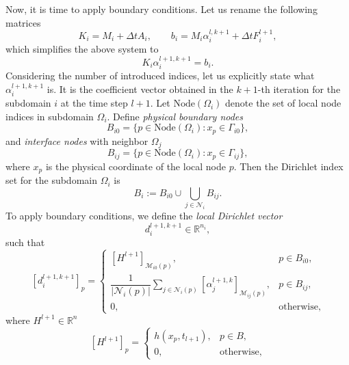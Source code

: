 \documentclass[a4paper, 11pt]{article}
\theoremstyle{plain}
\theoremstyle{definition}
\theoremstyle{remark}
\begin{document}
Now, it is time to apply boundary conditions. Let us rename the following matrices
\begin{equation*}
    K_{i} = M_{i} + \Delta t A_{i}, \qquad b_{i} = M_{i} \alpha_{i}^{l, k+1} + \Delta tF_{i}^{l+1}, 
\end{equation*}
which simplifies the above system to
\begin{equation*}
    K_{i}\alpha_{i}^{l+1, k+1} = b_{i}.
\end{equation*}
Considering the number of introduced indices, let us explicitly state what $\alpha_{i}^{l+1, k+1}$ is. It is the coefficient vector obtained in the $k+1$-th iteration for the subdomain $i$ at the time step $l+1$. Let $\text{Node}(\Omega_{i})$ denote the set of local node indices in subdomain $\Omega_{i}$. Define \textit{physical boundary nodes}
\begin{equation*}
    B_{i0} = \{p\in \text{Node}(\Omega_{i}): x_{p}\in \Gamma_{i0}\},
\end{equation*}
and \textit{interface nodes} with neighbor $\Omega_{j}$
\begin{equation*}
    B_{ij} = \{p\in \text{Node}(\Omega_{i}): x_{p}\in \Gamma_{ij}\},
\end{equation*}
where $x_p$ is the physical coordinate of the local node $p$. Then the Dirichlet index set for the subdomain $\Omega_{i}$ is
\begin{equation*}
    B_{i} := B_{i0} \cup \bigcup_{j\in\mathcal N_i} B_{ij}.
\end{equation*}
To apply boundary conditions, we define the \textit{local Dirichlet vector} 
\begin{equation*}
    d^{l+1, k+1}_{i} \in \mathbb{R}^{n_{i}},
\end{equation*}
such that
\begin{equation*}
    \left[d^{l+1, k+1}_{i}\right]_{p} = 
    \begin{cases}
        \left[H^{l+1}\right]_{\mathcal{M}_{i0}(p)}, & p\in B_{i0},\\[3pt]
        \dfrac{1}{\lvert \mathcal{N}_{i}(p)\rvert}\sum\limits_{j\in\mathcal{N}_{i}(p)}\left[\alpha^{l+1, k}_{j}\right]_{\mathcal{M}_{ij}(p)}, & p\in B_{ij},\\
        0, & \text{otherwise},
    \end{cases}
\end{equation*}
where $H^{l+1}\in \mathbb{R}^{n}$
\begin{equation*}
    \left[H^{l+1}\right]_{p} = 
    \begin{cases}
        h(x_{p}, t_{l+1}), & p\in B,\\
        0, & \text{otherwise},
    \end{cases}
\end{equation*}
\end{document}
